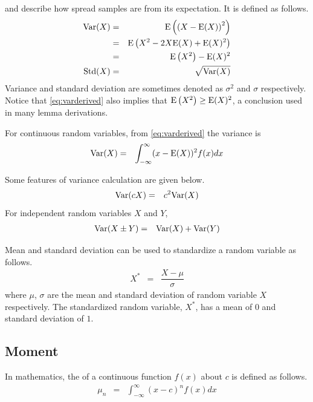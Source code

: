  and  describe how spread samples are from its expectation. It is defined as follows.
\begin{eqnarray}
	\textup{Var}(X) &=& \textup{E}\left(\left(X-\textup{E}(X)\right)^2\right) \label{eq:vardef} \\
	&=& \textup{E}\left(X^2-2X\textup{E}(X)+\textup{E}(X)^2\right) \nonumber \\
	&=& \textup{E}\left(X^2\right)-\textup{E}(X)^2 \label{eq:varderived} \\
	\textup{Std}(X) &=& \sqrt{\textup{Var}(X)} \nonumber
\end{eqnarray}
Variance and standard deviation are sometimes denoted as $\sigma^2$ and $\sigma$ respectively. Notice that \eqref{eq:varderived} also implies that $\textup{E}\left(X^2\right) \geq \textup{E}(X)^2$, a conclusion used in many lemma derivations.

For continuous random variables, from \eqref{eq:varderived} the variance is
\begin{eqnarray}
	\textup{Var}(X) &=& \int_{-\infty}^{\infty} (x-\textup{E}(X))^2f(x)dx \nonumber
\end{eqnarray}

Some features of variance calculation are given below.
\begin{eqnarray}
	\textup{Var}(cX) &=& c^2\textup{Var}(X) \nonumber
\end{eqnarray}
For independent random variables $X$ and $Y$,
\begin{eqnarray}
	\textup{Var}(X\pm Y) &=& \textup{Var}(X) + \textup{Var}(Y) \nonumber
\end{eqnarray}

Mean and standard deviation can be used to standardize a random variable as follows.
\begin{eqnarray}
	X^* &=& \dfrac{X-\mu}{\sigma} \nonumber
\end{eqnarray}
where $\mu$, $\sigma$ are the mean and standard deviation of random variable $X$ respectively. The standardized random variable, $X^*$, has a mean of $0$ and standard deviation of $1$.

\subsection{Moment} \label{sec:moments}

In mathematics, the  of a continuous function $f(x)$ about $c$ is defined as follows.
\begin{eqnarray}
	\mu_n &=& \int_{-\infty}^{\infty}(x-c)^nf(x)dx \nonumber
\end{eqnarray}

